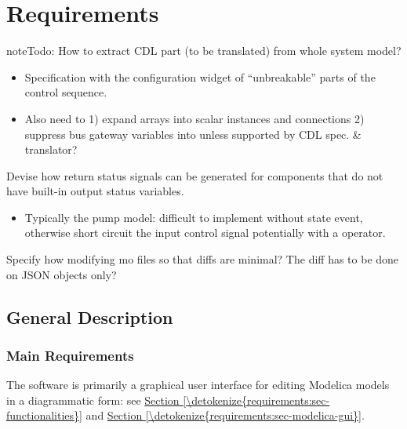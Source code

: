 \documentclass[letterpaper,10pt, openany,english]{sphinxmanual}
\begin{document}
\chapter{Requirements}
\label{\detokenize{requirements:requirements}}\label{\detokenize{requirements:sec-requirements}}\label{\detokenize{requirements::doc}}
\begin{sphinxadmonition}{note}{\label{\detokenize{requirements:id1}}Todo:}
How to extract CDL part (to be translated) from whole system model?
\begin{itemize}
\item {} 
Specification with the configuration widget of “unbreakable” parts of the control sequence.

\item {} 
Also need to 1) expand arrays into scalar instances and connections 2) suppress bus gateway variables  into  unless supported by CDL spec. \& translator?

\end{itemize}

Devise how return status signals can be generated for components that do not have built-in output status variables.
\begin{itemize}
\item {} 
Typically the pump model: difficult to implement without state event, otherwise short circuit the input control signal potentially with a  operator.

\end{itemize}

Specify how modifying mo files so that diffs are minimal? The diff has to be done on JSON objects only?
\end{sphinxadmonition}


\section{General Description}
\label{\detokenize{requirements:general-description}}\label{\detokenize{requirements:sec-general-description}}

\subsection{Main Requirements}
\label{\detokenize{requirements:main-requirements}}
The software is primarily a graphical user interface for editing Modelica models in a diagrammatic form: see \hyperref[\detokenize{requirements:sec-functionalities}]{Section \ref{\detokenize{requirements:sec-functionalities}}} and \hyperref[\detokenize{requirements:sec-modelica-gui}]{Section \ref{\detokenize{requirements:sec-modelica-gui}}}.
\end{document}
